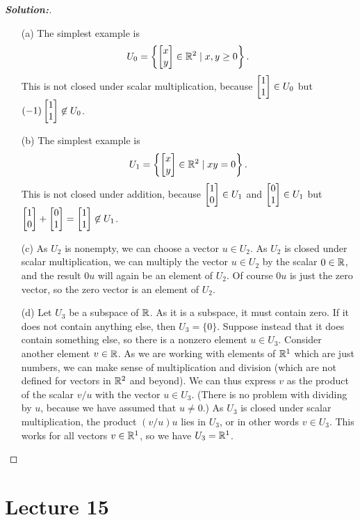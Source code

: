 \documentclass[a4paper]{amsart}
\theoremstyle{definition}
\newenvironment{solution}{\begin{proof}[\textbf{Solution:}] \vphantom{u}}{\end{proof}}
\begin{document}
\begin{solution}
 \begin{itemize}
  \item[(a)] The simplest example is 
   \[ U_0=\left\{\left[\begin{matrix} x \\ y\end{matrix}\right] \in{\mathbb{R}}^2\;|\; x,y\geq 0\right\}. \]
   This is not closed under scalar multiplication, because
   $\left[\begin{matrix} 1\\ 1\end{matrix}\right]\in U_0$ but $(-1)\left[\begin{matrix} 1 \\ 1\end{matrix}\right]\not\in U_0$.
  \item[(b)] The simplest example is 
   \[ U_1=\left\{\left[\begin{matrix} x \\ y\end{matrix}\right] \in{\mathbb{R}}^2\;|\; xy=0\right\}. \]
   This is not closed under addition, because
   $\left[\begin{matrix} 1\\ 0\end{matrix}\right]\in U_1$ and $\left[\begin{matrix} 0\\1\end{matrix}\right]\in U_1$ but
   $\left[\begin{matrix} 1\\0\end{matrix}\right]+\left[\begin{matrix} 0\\1\end{matrix}\right]=\left[\begin{matrix} 1\\1\end{matrix}\right]\not\in U_1$.
  \item[(c)] As $U_2$ is nonempty, we can choose a vector $u\in U_2$.
   As $U_2$ is closed under scalar multiplication, we can multiply the
   vector $u\in U_2$ by the scalar $0\in{\mathbb{R}}$, and the result $0u$ will
   again be an element of $U_2$.  Of course $0u$ is just the zero
   vector, so the zero vector is an element of $U_2$.
  \item[(d)] Let $U_3$ be a subspace of ${\mathbb{R}}$.  As it is a subspace, it
   must contain zero.  If it does not contain anything else, then
   $U_3=\{0\}$.  Suppose instead that it does contain something else,
   so there is a nonzero element $u\in U_3$.  Consider another element
   $v\in{\mathbb{R}}$.  As we are working with elements of ${\mathbb{R}}^1$ which are just
   numbers, we can make sense of multiplication and division (which
   are not defined for vectors in ${\mathbb{R}}^2$ and beyond).  We can thus
   express $v$ as the product of the scalar $v/u$ with the vector
   $u\in U_3$.  (There is no problem with dividing by $u$, because we
   have assumed that $u\neq 0$.)  As $U_3$ is closed under scalar
   multiplication, the product $(v/u)u$ lies in $U_3$, or in other
   words $v\in U_3$.  This works for all vectors $v\in{\mathbb{R}}^1$, so we
   have $U_3={\mathbb{R}}^1$.
 \end{itemize}
\end{solution}

\section{Lecture 15}
\end{document}
